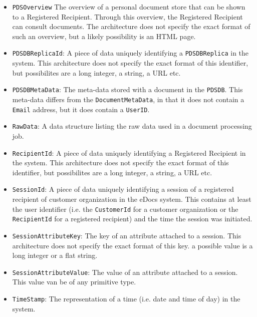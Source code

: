 \documentclass[a4paper,10pt]{article}
\begin{document}
\begin{itemize}
	\item \texttt{PDSOverview} The overview of a personal document store that can be shown to a Registered Recipient. Through this overview, the Registered Recipient can consult documents. The architecture does not specify the exact format of such an overview, but a likely possibility is an HTML page.
    
    \item \texttt{PDSDBReplicaId}:  A piece of data uniquely identifying a \texttt{PDSDBReplica} in the system. This architecture does not specify the exact format of this identifier, but possibilites are a long integer, a string, a URL etc.
    
    \item \texttt{PDSDBMetaData}: The meta-data stored with a document in the \texttt{PDSDB}. This meta-data differs from the \texttt{DocumentMetaData}, in that it does not contain a \texttt{Email} address, but it does contain a \texttt{UserID}.
    
    
    \item \texttt{RawData}: A data structure listing the raw data used in a document processing job.
    
    \item \texttt{RecipientId}: A piece of data uniquely identifying a Registered Recipient in the system. This architecture does not specify the exact format of this identifier, but possibilites are a long integer, a string, a URL etc.
    
    \item \texttt{SessionId}: A piece of data uniquely identifying a session of a registered recipient of customer organization in the eDocs system. This contains at least the user identifier (i.e. the \texttt{CustomerId} for a customer organization or the \texttt{RecipientId} for a registered recipient) and the time the session was initiated.
    
    \item \texttt{SessionAttributeKey}: The key of an attribute attached to a session. This architecture does not specify the exact format of this key. a possible value is a long integer or a flat string.
    
    \item \texttt{SessionAttributeValue}: The value of an attribute attached to a session. This value van be of any primitive type.
    
    \item \texttt{TimeStamp}: The representation of a time (i.e. date and time of day) in the system.
    

\end{itemize}
\end{document}
